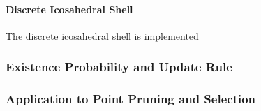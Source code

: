 \paragraph{Discrete Icosahedral Shell}

The discrete icosahedral shell is implemented

\subsubsection{Existence Probability and Update Rule}

\subsubsection{Application to Point Pruning and Selection}
